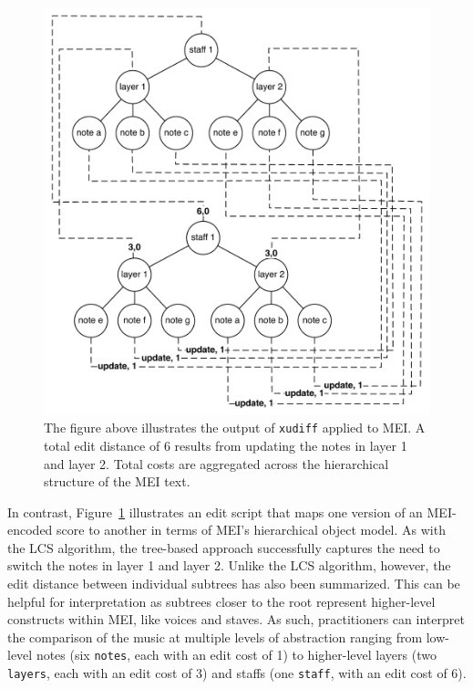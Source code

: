 \documentclass{article}
\newcommand{\code}[1]{\texttt{#1}}
\begin{document}
\begin{figure}[h]
\centering
\includegraphics[width=\columnwidth]{figures/hierarchical-diff.pdf}
\caption{The figure above illustrates the output of \code{xudiff}
  applied to MEI.  A total edit distance of 6 results from updating
  the notes in layer 1 and layer 2.  Total costs are aggregated across
the hierarchical structure of the MEI text.}
\label{fig:hierarchical-diff}
\end{figure}

In contrast, Figure~\ref{fig:hierarchical-diff} illustrates an edit
script that maps one version of an MEI-encoded score to another
in terms of MEI's hierarchical object model.  As with the LCS
algorithm, the tree-based approach successfully captures the need to
switch the notes in layer 1 and layer 2.  Unlike the LCS algorithm,
however, the edit distance between individual subtrees has also been
summarized.  This can be helpful for interpretation as subtrees closer
to the root represent higher-level constructs within MEI, like voices and staves.  
As such, practitioners can interpret the comparison of the music at multiple levels 
of abstraction ranging from low-level notes (six \code{notes}, each with an edit cost of 1) 
to higher-level layers (two \code{layers}, each with an edit cost of 3) and staffs (one \code{staff}, 
with an edit cost of 6).
\end{document}
